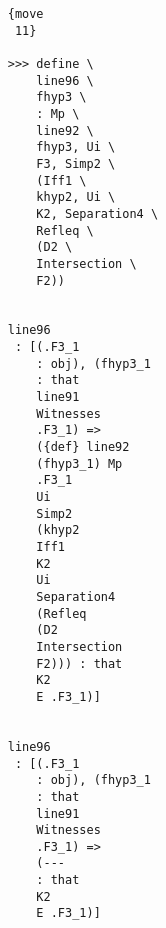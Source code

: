 \documentclass[12pt]{article}
\begin{document}
\begin{verbatim}
                                    {move 
                                     11}

                                    >>> define \
                                        line96 \
                                        fhyp3 \
                                        : Mp \
                                        line92 \
                                        fhyp3, Ui \
                                        F3, Simp2 \
                                        (Iff1 \
                                        khyp2, Ui \
                                        K2, Separation4 \
                                        Refleq \
                                        (D2 \
                                        Intersection \
                                        F2))


                                    line96 
                                     : [(.F3_1 
                                        : obj), (fhyp3_1 
                                        : that 
                                        line91 
                                        Witnesses 
                                        .F3_1) => 
                                        ({def} line92 
                                        (fhyp3_1) Mp 
                                        .F3_1 
                                        Ui 
                                        Simp2 
                                        (khyp2 
                                        Iff1 
                                        K2 
                                        Ui 
                                        Separation4 
                                        (Refleq 
                                        (D2 
                                        Intersection 
                                        F2))) : that 
                                        K2 
                                        E .F3_1)]


                                    line96 
                                     : [(.F3_1 
                                        : obj), (fhyp3_1 
                                        : that 
                                        line91 
                                        Witnesses 
                                        .F3_1) => 
                                        (--- 
                                        : that 
                                        K2 
                                        E .F3_1)]



\end{verbatim}
\end{document}
